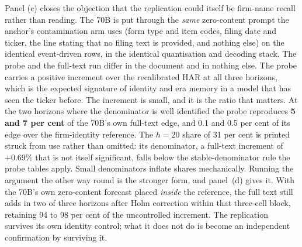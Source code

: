 Panel (c) closes the objection that the replication could itself be firm-name
recall rather than reading. The 70B is put through the \emph{same}
zero-content prompt the anchor's contamination arm uses (form type and
item codes, filing date and ticker, the line stating that no filing text
is provided, and nothing else) on the identical event-driven rows, in the identical
quantisation and decoding stack. The probe and the full-text run differ
in the document and in nothing else. %
The probe carries a positive increment over the recalibrated HAR at all
three horizons, which is the expected signature of identity and era memory
in a model that has seen the ticker before. The increment is small, and it
is the ratio that matters. At the two horizons where the denominator is
well identified the probe reproduces \textbf{5 and 7 per cent} of the
70B's own full-text edge, and 0.1 and 0.5 per cent of its edge over the
firm-identity reference. The $h{=}20$ share of 31 per cent is printed
struck from use rather than omitted: its denominator, a full-text
increment of $+0.69\%$ that is not itself significant, falls below the
stable-denominator rule the probe tables apply. Small denominators
inflate shares mechanically. Running the argument the other way round is
the stronger form, and panel~(d) gives it. With the 70B's own zero-content
forecast placed \emph{inside} the reference, the full text still adds in
two of three horizons after Holm correction within that three-cell block,
retaining 94 to 98 per cent of the uncontrolled increment. The
replication survives its own identity control; what it does not do is
become an independent confirmation by surviving it.


